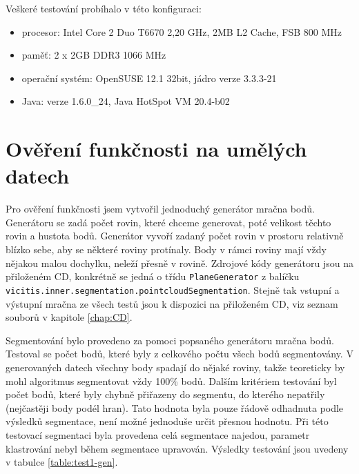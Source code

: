\documentclass[11pt,twoside,a4paper]{book}
\begin{document}
\noindent
Veškeré testování probíhalo v této konfiguraci:
\begin{itemize}
 \item procesor: Intel Core 2 Duo T6670 2,20 GHz, 2MB L2 Cache, FSB 800 MHz
 \item paměť: 2 x 2GB DDR3 1066 MHz 
 \item operační systém: OpenSUSE 12.1 32bit, jádro verze 3.3.3-21
 \item Java: verze 1.6.0\_24, Java HotSpot VM 20.4-b02
\end{itemize}

\section{Ověření funkčnosti na umělých datech}

Pro ověření funkčnosti jsem vytvořil jednoduchý generátor mračna bodů. Generátoru se zadá počet rovin, které chceme generovat, poté velikost těchto rovin a hustota bodů. Generátor vyvoří zadaný počet rovin v prostoru relativně blízko sebe, aby se některé roviny protínaly. Body v rámci roviny mají vždy nějakou malou dochylku, neleží přesně v rovině. Zdrojové kódy generátoru jsou na přiloženém CD, konkrétně se jedná o třídu \verb|PlaneGenerator| z balíčku \verb|vicitis.inner.segmentation.pointcloudSegmentation|. Stejně tak vstupní a výstupní mračna ze všech testů jsou k dispozici na přiloženém CD, viz seznam souborů v kapitole \ref{chap:CD}. 


Segmentování bylo provedeno za pomoci popsaného generátoru mračna bodů. Testoval se počet bodů, které byly z celkového počtu všech bodů segmentovány. V generovaných datech všechny body spadají do nějaké roviny, takže teoreticky by mohl algoritmus segmentovat vždy 100\% bodů. Dalším kritériem testování byl počet bodů, které byly chybně přiřazeny do segmentu, do kterého nepatřily (nejčastěji body podél hran). Tato hodnota byla pouze řádově odhadnuta podle výsledků segmentace, není možné jednoduše určit přesnou hodnotu. Při této testovací segmentaci byla provedena celá segmentace najedou, parametr klastrování nebyl během segmentace upravován. Výsledky testování jsou uvedeny v tabulce \ref{table:test1-gen}.
\end{document}

